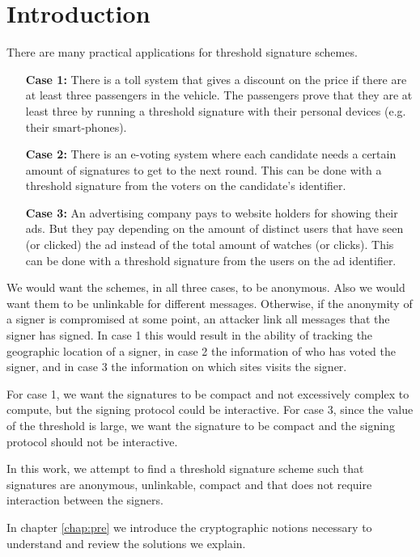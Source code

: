 \chapter{Introduction}

There are many practical applications for threshold signature schemes.

\begin{itemize}[align = left, leftmargin=*, label={--}]
\item[\textbf{Case 1:}] There is a toll system that gives a discount on the price if there are at least three passengers in the vehicle. The passengers prove that they are at least three by running a threshold signature with their personal devices (e.g. their smart-phones).

\item[\textbf{Case 2:}] There is an e-voting system where each candidate needs a certain amount of signatures to get to the next round.  This can be done with a threshold signature from the voters on the candidate's identifier.

\item[\textbf{Case 3:}] An advertising company pays to website holders for showing their ads. But they pay depending on the amount of distinct users that have seen (or clicked) the ad instead of the total amount of watches (or clicks). This can be done with a threshold signature from the users on the ad identifier.
\end{itemize}

We would want the schemes, in all three cases, to be anonymous. Also we would want them to be unlinkable for different messages. Otherwise, if the anonymity of a signer is compromised at some point, an attacker link all messages that the signer has signed. In case 1 this would result in the ability of tracking the geographic location of a signer, in case 2 the information of who has voted the signer, and in case 3 the information on which sites visits the signer.

For case 1, we want the signatures to be compact and not excessively complex to compute, but the signing protocol could be interactive. For case 3, since the value of the threshold is large, we want the signature to be compact and the signing protocol should not be interactive.

In this work, we attempt to find a threshold signature scheme such that signatures are anonymous, unlinkable, compact and that does not require interaction between the signers.

In chapter \ref{chap:pre} we introduce the cryptographic notions necessary to understand and review the solutions we explain.

